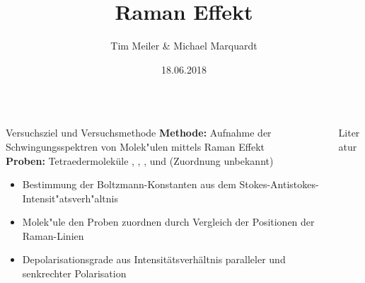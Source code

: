 \documentclass[final,hyperref={pdfpagelabels=false}]{beamer}
\title[Raman-Spektroskopie]{Raman Effekt}
\author[Meiler \& Marquardt]{Tim Meiler \& Michael Marquardt}
\institute[Universität Stuttgart]{Universität Stuttgart}
\date{18.06.2018}
\newenvironment{indentitemize}{%
    \begin{itemize}%
    \addtolength{\itemindent}{2ex}%
    \setlength{\leftmargin}{2ex}%
    \setlength{\topsep}{0pt}%
    }
    {%
\end{itemize}%
}
\newcommand*\circled[1]{\tikz[baseline=(char.base)]{
            \node[shape=circle,draw,inner sep=.4ex, line width = 1.5mm] (char) {#1};}}
\begin{document}
\begin{frame}{}
\begin{columns}[t]
    \begin{column}{.48\linewidth}
        \begin{block}{\circled{1} Versuchsziel und Versuchsmethode}
        \textbf{Methode:} Aufnahme der Schwingungsspektren von Molek"ulen mittels Raman Effekt\\
        \textbf{Proben:} Tetraedermoleküle , , ,  und  (Zuordnung unbekannt)
        \begin{indentitemize}
            \item Bestimmung der Boltzmann-Konstanten aus dem Stokes-Antistokes-Intensit"atsverh"altnis
            \item Molek"ule den Proben zuordnen durch Vergleich der Positionen der Raman-Linien
            \item Depolarisationsgrade aus Intensitätsverhältnis paralleler und senkrechter Polarisation
        \end{indentitemize}
        \end{block}
    \end{column}
    \hfill
    \begin{column}{.48\linewidth}
        \begin{block}{\circled{9} Literatur}
            \printbibliography
        \end{block}
    \end{column}
\end{columns}
\end{frame}
\end{document}
